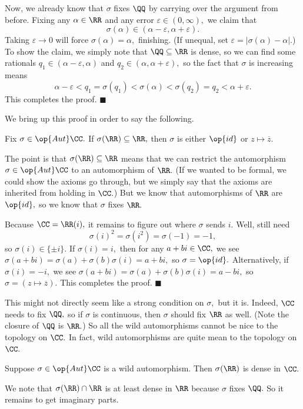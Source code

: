 Now, we already know that $\sigma$ fixes $\QQ$ by carrying over the argument from before. Fixing any $\alpha\in\RR$ and any error $\varepsilon\in(0,\infty),$ we claim that
\[\sigma(\alpha)\in(\alpha-\varepsilon,\alpha+\varepsilon).\]
Taking $\varepsilon\to0$ will force $\sigma(\alpha)=\alpha,$ finishing. (If unequal, set $\varepsilon=|\sigma(\alpha)-\alpha|.$) To show the claim, we simply note that $\QQ\subseteq\RR$ is dense, so we can find some rationals $q_1\in(\alpha-\varepsilon,\alpha)$ and $q_2\in(\alpha,\alpha+\varepsilon),$ so the fact that $\sigma$ is increasing means
\[\alpha-\varepsilon<q_1=\sigma(q_1)<\sigma(\alpha)<\sigma(q_2)=q_2<\alpha+\varepsilon.\]
This completes the proof. $\blacksquare$

We bring up this proof in order to say the following.
\begin{proposition}
    Fix $\sigma\in\op{Aut}\CC.$ If $\sigma(\RR)\subseteq\RR,$ then $\sigma$ is either $\op{id}$ or $z\mapsto\overline z.$
\end{proposition}
The point is that $\sigma(\RR)\subseteq\RR$ means that we can restrict the automorphism $\sigma\in\op{Aut}\CC$ to an automorphism of $\RR.$ (If we wanted to be formal, we could show the axioms go through, but we simply say that the axioms are inherited from holding in $\CC.$) But we know that automorphisms of $\RR$ are $\op{id},$ so we know that $\sigma$ fixes $\RR.$

Because $\CC=\RR(i),$ it remains to figure out where $\sigma$ sends $i.$ Well, still need
\[\sigma(i)^2=\sigma\left(i^2\right)=\sigma(-1)=-1,\]
so $\sigma(i)\in\{\pm i\}.$ If $\sigma(i)=i,$ then for any $a+bi\in\CC,$ we see $\sigma(a+bi)=\sigma(a)+\sigma(b)\sigma(i)=a+bi,$ so $\sigma=\op{id}.$ Alternatively, if $\sigma(i)=-i,$ we see $\sigma(a+bi)=\sigma(a)+\sigma(b)\sigma(i)=a-bi,$ so $\sigma=(z\mapsto\overline z).$ This completes the proof. $\blacksquare$

This might not directly seem like a strong condition on $\sigma,$ but it is. Indeed, $\CC$ needs to fix $\QQ,$ so if $\sigma$ is continuous, then $\sigma$ should fix $\RR$ as well. (Note the closure of $\QQ$ is $\RR.$) So all the wild automorphisms cannot be nice to the topology on $\CC.$ In fact, wild automorphisms are quite mean to the topology on $\CC.$
\begin{proposition}
    Suppose $\sigma\in\op{Aut}\CC$ is a wild automorphism. Then $\sigma(\RR)$ is dense in $\CC.$
\end{proposition}
We note that $\sigma(\RR)\cap\RR$ is at least dense in $\RR$ because $\sigma$ fixes $\QQ.$ So it remains to get imaginary parts.

